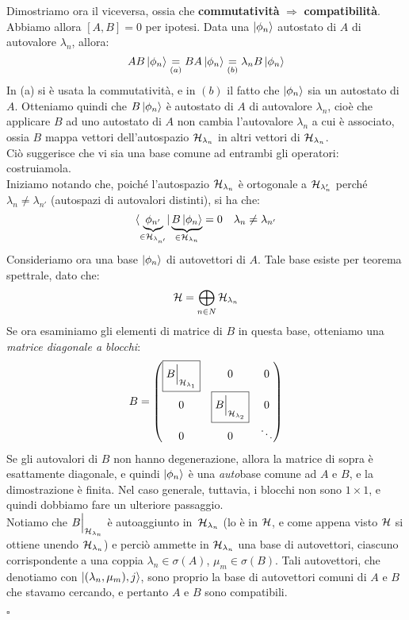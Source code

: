 \documentclass[../../FisicaTeorica.tex]{subfiles}
\begin{document}
Dimostriamo ora il viceversa, ossia che \textbf{commutatività} $\Rightarrow$ \textbf{compatibilità}.\\
Abbiamo allora $[A,B]=0$ per ipotesi. Data una $\ket{\phi_n}$ autostato di $A$ di autovalore $\lambda_n$, allora:
\[
AB\ket{\phi_n}\underset{(a)}{=}BA\ket{\phi_n} \underset{(b)}{=} \lambda_n B\ket{\phi_n}
\]
In (a) si è usata la commutatività, e in $(b)$ il fatto che $\ket{\phi_n}$ sia un autostato di $A$. Otteniamo quindi che $B\ket{\phi_n}$ è autostato di $A$ di autovalore $\lambda_n$, cioè che applicare $B$ ad uno autostato di $A$ non cambia l'autovalore $\lambda_n$ a cui è associato, ossia $B$ mappa vettori dell'autospazio $\mathcal{H}_{\lambda_n}$ in altri vettori di $\mathcal{H}_{\lambda_n}$.\\
Ciò suggerisce che vi sia una base comune ad entrambi gli operatori: costruiamola.\\
Iniziamo notando che, poiché l'autospazio $\mathcal{H}_{\lambda_n}$ è ortogonale a $\mathcal{H}_{\lambda_n'}$ perché $\lambda_n\neq \lambda_{n'}$ (autospazi di autovalori distinti), si ha che:
\[
\bra{\underbrace{\phi_{n'}}_{\in \mathcal{H}_{\lambda_{n'}}}}\underbrace{B \ket{\phi_n}}_{\in \mathcal{H}_{\lambda_n}}=0 \quad \lambda_n \neq \lambda_{n'}
\]
Consideriamo ora una base $\ket{\phi_n}$ di autovettori di $A$. Tale base esiste per teorema spettrale, dato che:
\[
\mathcal{H}=\bigoplus_{n\in N} \mathcal{H}_{\lambda_n}
\]
Se ora esaminiamo gli elementi di matrice di $B$ in questa base, otteniamo una \textit{matrice diagonale a blocchi}:
\[
B=\begin{pmatrix}
\boxed{B\Big|_{\mathcal{H}_{\lambda_1}}} & 0 & 0\\
0 & \boxed{B\Big|_{\mathcal{H}_{\lambda_2}}} & 0\\
0 & 0 & \ddots
\end{pmatrix}
\]
Se gli autovalori di $B$ non hanno degenerazione, allora la matrice di sopra è esattamente diagonale, e quindi $\ket{\phi_n}$ è una \textit{auto}base comune ad $A$ e $B$, e la dimostrazione è finita. Nel caso generale, tuttavia, i blocchi non sono $1\times 1$, e quindi dobbiamo fare un ulteriore passaggio.\\
Notiamo che $B\Big|_{\mathcal{H}_{\lambda_n}}$ è autoaggiunto in\ $\mathcal{H}_{\lambda_n}$ (lo è in $\mathcal{H}$, e come appena visto $\mathcal{H}$ si ottiene unendo $\mathcal{H}_{\lambda_n}$) e perciò ammette in $\mathcal{H}_{\lambda_n}$ una base di autovettori, ciascuno corrispondente a una coppia $\lambda_n \in \sigma(A)$, $\mu_m \in \sigma(B)$. Tali autovettori, che denotiamo con $\ket{(\lambda_n, \mu_m), j}$, sono proprio la base di autovettori comuni di $A$ e $B$ che stavamo cercando, e pertanto $A$ e $B$ sono compatibili.
\begin{flushright}
$\square$
\end{flushright}
\end{document}
